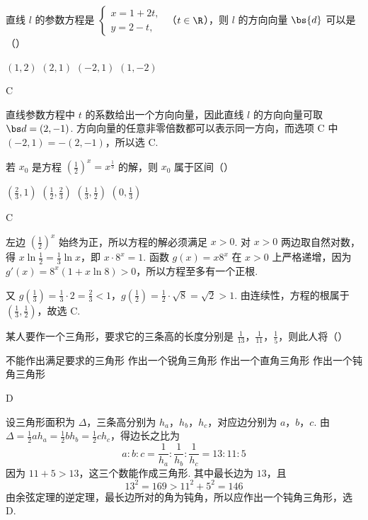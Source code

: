 \begin{problem}
直线 \(l\) 的参数方程是 \(\begin{cases}
x = 1 + 2t,\\
y = 2 - t,
\end{cases}\) （\(t \in \R\)），则 \(l\) 的方向向量 \(\bs{d}\) 可以是（\quad）

\choices
    {\((1,2)\)}
    {\((2,1)\)}
    {\((-2,1)\)}
    {\((1,-2)\)}

\begin{answer}
C
\end{answer}

\begin{solution}
直线参数方程中 \(t\) 的系数给出一个方向向量，因此直线 \(l\) 的方向向量可取 \(\bs d=(2,-1)\). 方向向量的任意非零倍数都可以表示同一方向，而选项 C 中
\((-2,1)=-(2,-1)\)，所以选 C.
\end{solution}
\end{problem}

\begin{problem}
若 \(x_0\) 是方程 \(\left(\frac{1}{2}\right)^x = x^{\frac{1}{3}}\) 的解，则 \(x_0\) 属于区间（\quad）

\choices
    {\(\left(\frac{2}{3},1\right)\)}
    {\(\left(\frac{1}{2}, \frac{2}{3}\right)\)}
    {\(\left(\frac{1}{3}, \frac{1}{2}\right)\)}
    {\(\left(0, \frac{1}{3}\right)\)}

\begin{answer}
C
\end{answer}

\begin{solution}
左边 \(\left(\frac12\right)^x\) 始终为正，所以方程的解必须满足 \(x>0\). 对 \(x>0\) 两边取自然对数，得
\(x\ln\frac12=\frac13\ln x\)，\(\text{即 }x\cdot 8^x=1\).
函数 \(g(x)=x8^x\) 在 \(x>0\) 上严格递增，因为
\(g'(x)=8^x(1+x\ln8)>0\)，所以方程至多有一个正根.

又
\(g\left(\frac13\right)=\frac13\cdot2=\frac23<1\)，\(g\left(\frac12\right)=\frac12\cdot\sqrt8=\sqrt2>1\).
由连续性，方程的根属于 \(\left(\frac13,\frac12\right)\)，故选 C.
\end{solution}
\end{problem}

\begin{problem}
某人要作一个三角形，要求它的三条高的长度分别是 \(\frac{1}{13}\)，\(\frac{1}{11}\)，\(\frac{1}{5}\)，则此人将（\quad）

\choices
    {不能作出满足要求的三角形}
    {作出一个锐角三角形}
    {作出一个直角三角形}
    {作出一个钝角三角形}

\begin{answer}
D
\end{answer}

\begin{solution}
设三角形面积为 \(\Delta\)，三条高分别为 \(h_a\)，\(h_b\)，\(h_c\)，对应边分别为 \(a\)，\(b\)，\(c\). 由
\(\Delta=\frac12ah_a=\frac12bh_b=\frac12ch_c\)，得边长之比为
\[
a:b:c=\frac1{h_a}:\frac1{h_b}:\frac1{h_c}=13:11:5
\]
因为 \(11+5>13\)，这三个数能作成三角形. 其中最长边为 \(13\)，且
\[
13^2=169>11^2+5^2=146
\]
由余弦定理的逆定理，最长边所对的角为钝角，所以应作出一个钝角三角形，选 D.
\end{solution}
\end{problem}

